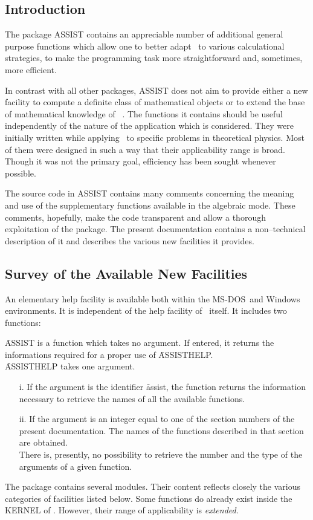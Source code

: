 \subsection{Introduction}
 The package ASSIST contains
an appreciable number of additional general purpose functions which allow
one to better adapt \REDUCE\ to various calculational strategies,
to make the programming task more straightforward and, sometimes, 
more efficient.

In contrast with all other packages, ASSIST does not aim to provide either a
new facility to compute a definite class of mathematical objects or to extend
the base of mathematical knowledge of \REDUCE\ .
The functions it contains should be
useful independently of the nature of the application which is considered.
They were initially written while applying \REDUCE\ to specific problems in
theoretical physics. Most of them were designed
in such a way that their applicability range is broad. Though it was not
the primary goal, efficiency has been sought whenever possible.

The source code in ASSIST contains many comments concerning
the meaning and use of the supplementary functions available
in the algebraic mode. These comments, hopefully, make the code transparent
and allow a thorough exploitation of the package. The present documentation
contains a non--technical description of it and describes the
various new facilities it provides.
\subsection{ Survey of the Available New Facilities}
An elementary help facility is available both within
the MS-DOS\ and Windows environments. It is independent of the
help facility of \REDUCE\ itself. It includes two functions:

\f{ASSIST} is a function which takes no argument. If entered, it returns 
the informations required for a proper use  of \f{ASSISTHELP}.\\   
\f{ASSISTHELP} takes one argument.   
\begin{itemize}
\item[i.] If the argument is the identifier \f{assist}, the function 
returns the information necessary to retrieve the names of all the available
functions.
\item[ii.] If the argument is an integer equal to one of the section numbers
of the present documentation. The names of the functions described
in that section are obtained.\\
There is, presently, no possibility to retrieve the number and the type of 
the arguments of a given function.
\end{itemize}
The package contains several modules. Their content reflects closely
the various categories of facilities listed below. Some functions do
already exist inside the KERNEL of \REDUCE. However, their range
of applicability is \emph{extended}.


